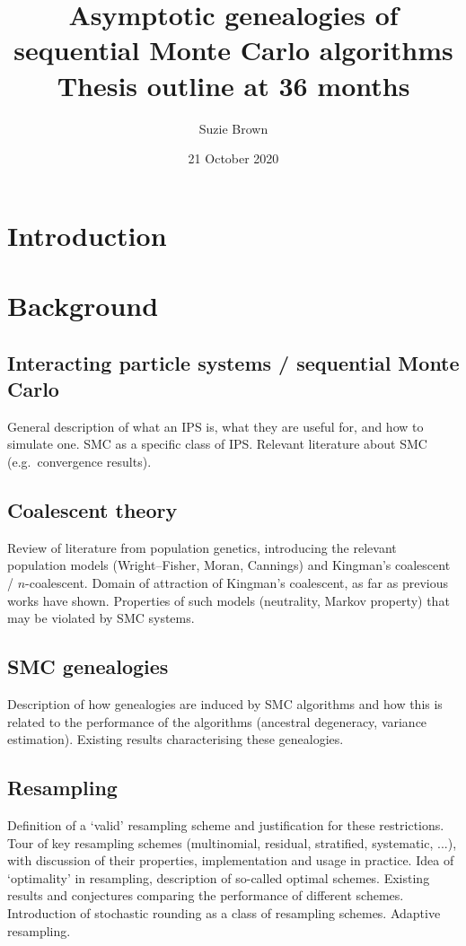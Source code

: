 \documentclass{article}
\title{Asymptotic genealogies of sequential Monte Carlo algorithms\\Thesis outline at 36 months}
\author{Suzie Brown}
\date{21 October 2020}
\begin{document}
\maketitle

\section{Introduction}

\section{Background}
\subsection{Interacting particle systems / sequential Monte Carlo}
General description of what an IPS is, what they are useful for, and how to simulate one. SMC as a specific class of IPS. Relevant literature about SMC (e.g.\ convergence results).
\subsection{Coalescent theory}
Review of literature from population genetics, introducing the relevant population models (Wright--Fisher, Moran, Cannings) and Kingman's coalescent / $n$-coalescent. Domain of attraction of Kingman's coalescent, as far as previous works have shown. Properties of such models (neutrality, Markov property) that may be violated by SMC systems.
\subsection{SMC genealogies}
Description of how genealogies are induced by SMC algorithms and how this is related to the performance of the algorithms (ancestral degeneracy, variance estimation). Existing results characterising these genealogies.
\subsection{Resampling} %
Definition of a `valid' resampling scheme and justification for these restrictions. Tour of key resampling schemes (multinomial, residual, stratified, systematic, ...), with discussion of their properties, implementation and usage in practice. Idea of `optimality' in resampling, description of so-called optimal schemes. Existing results and conjectures comparing the performance of different schemes. Introduction of stochastic rounding as a class of resampling schemes. Adaptive resampling.
\end{document}
